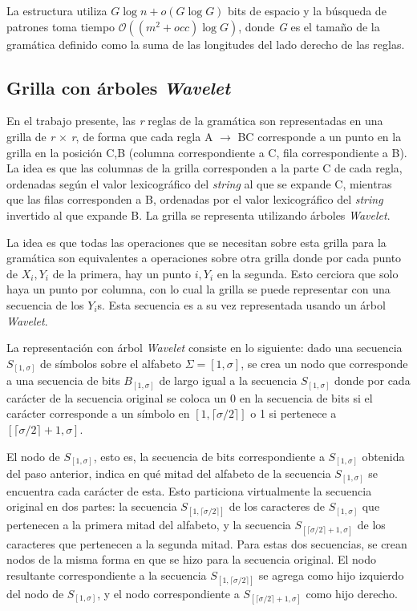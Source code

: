 La estructura utiliza $G \log n + o(G \log G)$ bits de espacio y la búsqueda de patrones toma tiempo  $\mathcal{O}((m^2 + occ) \log G )$, donde \textit{G} es el tamaño de la gramática definido como la suma de las longitudes del lado derecho de las reglas. 

\subsection{Grilla con árboles \textit{Wavelet}}

En el trabajo presente, las \textit{r} reglas de la gramática son representadas en una grilla de \textit{r} $\times$ \textit{r}, de forma que cada regla A $\rightarrow$ BC corresponde a un punto en la grilla en la posición C,B (columna correspondiente a C, fila correspondiente a B). La idea es que las columnas de la grilla corresponden a la parte C de cada regla, ordenadas según el valor lexicográfico del \textit{string} al que se expande C, mientras que las filas corresponden a B, ordenadas por el valor lexicográfico del \textit{string} invertido al que expande B. La grilla se representa utilizando árboles \textit{Wavelet}\cite[Capítulo 10.1]{Navarro}.

La idea es que todas las operaciones que se necesitan sobre esta grilla para la gramática son equivalentes a operaciones sobre otra grilla donde por cada punto de $X_i,Y_i$ de la primera, hay un punto $i, Y_i$ en la segunda. Esto cerciora que solo haya un punto por columna, con lo cual la grilla se puede representar con una secuencia de los $Y_i$s. Esta secuencia es a su vez representada usando un árbol \textit{Wavelet}.

La representación con árbol \textit{Wavelet} consiste en lo siguiente: dado una secuencia $S_{[1,\sigma]}$ de símbolos sobre el alfabeto $\Sigma = [1,\sigma]$, se crea un nodo que corresponde a una secuencia de bits $B_{[1,\sigma]}$ de largo igual a la secuencia $S_{[1,\sigma]}$ donde por cada carácter de la secuencia original se coloca un 0 en la secuencia de bits si el carácter corresponde a un símbolo en $[1, \lceil  \sigma / 2 \rceil]$ o 1 si pertenece a $[\lceil  \sigma / 2 \rceil + 1, \sigma]$. 

El nodo de $S_{[1,\sigma]}$, esto es, la secuencia de bits correspondiente a $S_{[1,\sigma]}$ obtenida del paso anterior, indica en qué mitad del alfabeto de la secuencia  $S_{[1,\sigma]}$  se encuentra cada carácter de esta. Esto particiona virtualmente la secuencia original en dos partes: la secuencia $S_{[1,\lceil  \sigma / 2 \rceil]}$ de los caracteres de $S_{[1,\sigma]}$ que pertenecen a la primera mitad del alfabeto, y la secuencia $S_{[ \lceil \sigma / 2 \rceil + 1, \sigma]}$ de los caracteres que pertenecen a la segunda mitad. Para estas dos secuencias, se crean nodos de la misma forma en que se hizo para la secuencia original. El nodo resultante correspondiente a la secuencia $S_{[1,\lceil  \sigma / 2 \rceil]}$ se agrega como hijo izquierdo del nodo de $S_{[1,\sigma]}$, y el nodo correspondiente a $S_{[ \lceil \sigma / 2 \rceil + 1, \sigma]}$ como hijo derecho.


